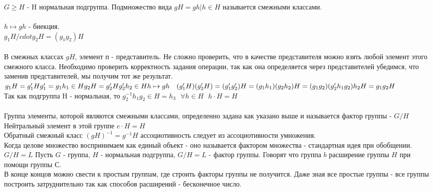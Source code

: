 \\
\\
\\

\begin{center}
\end{center}

$G \ge H$ - H нормальная подгруппа. Подмножество вида $gH = {gh | h \in H}$
называется смежными классами.\\
\\ 
$h \mapsto gh$ - биекция.\\
$g_1H /cdot g_2H = (g_1 g_2)H$\\

\\

В смежных классах $gH$, элемент п - представитель. Не сложно проверить, что в 
качестве представителя можно взять любой элемент этого смежного класса. 
Необходимо проверить корректность задания операции, так как она определяется 
через представителей убедимся, что заменив представителей, мы получим тот же 
результат.\\
$g_1H = g'_1H\\
g'_1 = g_1 h_1 \in H\\
g_2H = g'_2H\\
g'_2 h_2 \in H\\
h \mapsto gh ~~~ (g'_1 H)(g'_2 H) = (g'_1 g'_2)H = (g_1 h_1)(g_2 h_2)H = 
(g_1 g_2)(g'_2 h_1 g_2)h_2 H = g_1 g_2 H$\\
Так как подгруппа H - нормальная, то $g^{-1}_2 h_1 g_2 \in H = h_3 ~~~ 
\forall h \in H ~~~ h \cdot H = H$\\

\\
Группа элементы, которой являются смежными классами, определенно задана как 
указано выше и называется фактор группы - $G/H$\\
Нейтральный элемент в этой группе $e \cdot H = H$\\
Обратный смежный класс $(gH)^{-1} = g^{-1}H$ ассоциотивность следует из 
ассоциотивности умножения.\\
Когда целове множество воспринимаем как единый объект - оно называется фактором 
множества - стандартная идея при обобщении.\\
$G/H = L$ Пусть $G$ - группа, $H$ - нормальная подгруппа, $G/H = L$ - фактор 
группы. Говорят что группа $b$ расширение группы $H$ при помощи группы С.\\
В конце концов можно свести к простым группам, где строить факторы группы не 
получится. Даже зная все простые группы - все группы построить затруднительно
так как способов расширений - бесконечное число.\\

